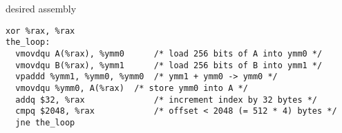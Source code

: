 
\begin{frame}[fragile,label=vecAddAsm]{desired assembly}
\begin{lstlisting}[language=myasm,style=small]
  xor %rax, %rax
the_loop:
  vmovdqu A(%rax), %ymm0      /* load 256 bits of A into ymm0 */
  vmovdqu B(%rax), %ymm1      /* load 256 bits of B into ymm1 */
  vpaddd %ymm1, %ymm0, %ymm0  /* ymm1 + ymm0 -> ymm0 */
  vmovdqu %ymm0, A(%rax)  /* store ymm0 into A */
  addq $32, %rax              /* increment index by 32 bytes */
  cmpq $2048, %rax            /* offset < 2048 (= 512 * 4) bytes */
  jne the_loop
\end{lstlisting}
\end{frame}

